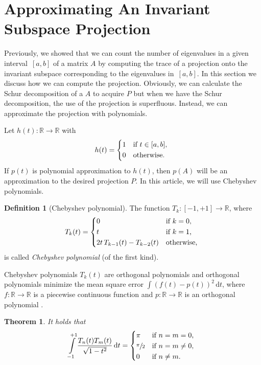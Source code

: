 \documentclass[%
	paper=a4,
	fontsize=10pt,
	DIV11,BCOR10mm,
	numbers=noenddot,
	abstract=yes
]{scrartcl}
\newcommand{\R}{\mathbb{R}}
\newtheorem{theorem}{Theorem}[section]
\theoremstyle{definition}
\newtheorem{definition}{Definition}[section]
\begin{document}
\section{Approximating An Invariant Subspace Projection}
\label{sec:projection-approximation}

Previously, we showed that we can count the number of eigenvalues in a given
interval~$[a, b]$ of a matrix $A$ by computing the trace of a projection onto
the invariant subspace corresponding to the eigenvalues in~$[a, b]$. In this
section we discuss how we can compute the projection. Obviously, we can
calculate the Schur decomposition of a $A$ to acquire $P$ but when we have the
Schur decomposition, the use of the projection is superfluous. Instead, we can
approximate the projection with polynomials.

Let $h(t): \R \rightarrow \R$ with
\[
	h(t) =
	\begin{dcases*}
		1 & if $t \in [a, b]$, \\
		0 & otherwise.
	\end{dcases*}
\]
If $p(t)$ is polynomial approximation to $h(t)$, then $p(A)$ will be an
approximation to the desired projection $P$. In this article, we will use
Chebyshev polynomials.

\begin{definition}[Chebyshev polynomial]
	The function $T_k: [-1, +1] \rightarrow \R$, where
	\[
		T_k(t) =
		\begin{dcases*}
			0 & if $k = 0$, \\
			t & if $k = 1$, \\
			2 t \, T_{k-1}(t) - T_{k-2}(t) & otherwise,
		\end{dcases*}
	\]
	is called \emph{Chebyshev polynomial} (of the first kind).
\end{definition}

Chebyshev polynomials $T_k(t)$ are orthogonal polynomials and orthogonal
polynomials minimize the mean square error $\int (f(t) - p(t))^2 \,\mathrm{d}t$,
where $f: \R \rightarrow \R$ is a piecewise continuous function and $p: \R
\rightarrow \R$ is an orthogonal polynomial \cite[Chapter II,
§1.3]{Courant1953}.

\begin{theorem}
	It holds that
	\[
		\int\limits_{-1}^{+1} \frac{T_n(t) T_m(t)}{\sqrt{1 - t^2}}\,\mathrm{d}t=
		\begin{dcases*}
			\pi & if $n = m = 0$, \\
			\sfrac{\pi}{2} & if $n = m \neq 0$, \\
			0 & if $n \neq m$.
		\end{dcases*}
	\]
\end{theorem}
\end{document}

